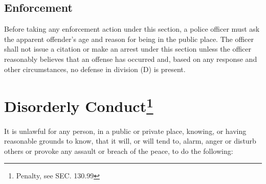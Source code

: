 \subsection{Enforcement}  Before taking any enforcement action under this section, a police officer must ask the apparent offender’s age and reason for being in the public place.  The officer shall not issue a citation or make an arrest under this section unless the officer reasonably believes that an offense has occurred and, based on any response and other circumstances, no defense in division (D) is present.

\section{Disorderly Conduct\footnote{Penalty, see SEC. 130.99}}
It is unlawful for any person, in a public or private place, knowing, or having reasonable grounds to know, that it will, or will tend to, alarm, anger or disturb others or provoke any assault or breach of the peace, to do the following:
